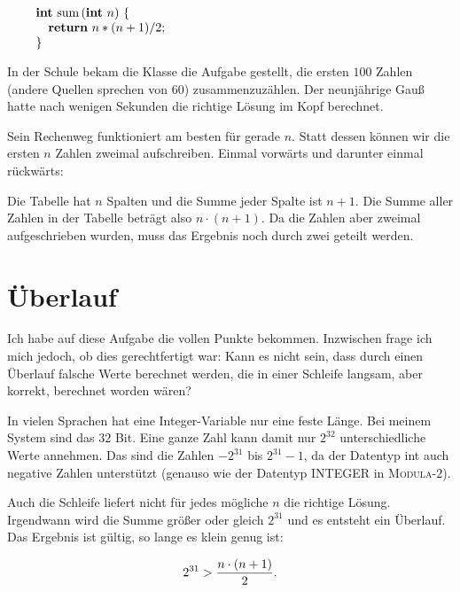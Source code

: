$$\vbox{\obeylines
{\bf int} sum$\,$({\bf int} $n$) $\{$
\quad {\bf return} $n * (n + 1) / 2$;
$\}$}$$

\noindent In der Schule bekam die Klasse die Aufgabe gestellt, die ersten $100$ Zahlen
(andere Quellen sprechen von $60$) zusammenzuzählen.
Der neunjährige Gauß hatte nach wenigen Sekunden die richtige Lösung im Kopf
berechnet.

Sein Rechenweg funktioniert am besten für gerade $n$.
Statt dessen können wir die ersten $n$ Zahlen zweimal aufschreiben.
Einmal vorwärts und darunter einmal rückwärts:


\noindent Die Tabelle hat $n$ Spalten und die Summe jeder Spalte ist $n+1$.
Die Summe aller Zahlen in der Tabelle beträgt also $n\cdot(n+1)$.
Da die Zahlen aber zweimal aufgeschrieben wurden, muss das
Ergebnis noch durch zwei geteilt werden.

\section{Überlauf}%
%
Ich habe auf diese Aufgabe die vollen Punkte bekommen.
Inzwischen frage ich mich jedoch, ob dies gerechtfertigt war:
Kann es nicht sein, dass durch einen Überlauf falsche Werte
berechnet werden, die in einer Schleife langsam, aber korrekt,
berechnet worden wären?

\def\lstinline#1{#1}
In vielen Sprachen hat eine Integer-Variable nur eine feste Länge.
Bei meinem System sind das $32$ Bit.
Eine ganze Zahl kann damit nur $2^{32}$ unterschiedliche Werte annehmen.
Das sind die Zahlen $-2^{31}$ bis $2^{31}-1$, da der Datentyp \lstinline{int}
auch negative Zahlen unterstützt
(genauso wie der Datentyp \lstinline{INTEGER}
in \textsc{Modula-$2$}).

Auch die Schleife liefert nicht für jedes mögliche $n$ die richtige Lösung.
Irgendwann wird die Summe größer oder gleich $2^{31}$ und es entsteht ein
Überlauf.
Das Ergebnis ist gültig, so lange es klein genug ist:

$$2^{31} > {n\cdot(n + 1)\over 2}\hbox{.}$$

